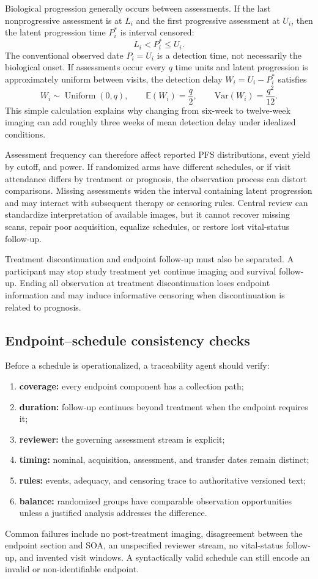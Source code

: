 \documentclass[12pt,oneside]{book}
\numberwithin{equation}{section}
\theoremstyle{definition}
\theoremstyle{plain}
\theoremstyle{remark}
\newcommand{\E}{\mathbb{E}}
\newcommand{\Var}{\mathrm{Var}}
\begin{document}
Biological progression generally occurs between assessments.  If the last
nonprogressive assessment is at $L_i$ and the first progressive assessment at
$U_i$, then the latent progression time $P_i^*$ is interval censored:
\[
  L_i<P_i^*\le U_i.
\]
The conventional observed date $P_i=U_i$ is a detection time, not necessarily
the biological onset.  If assessments occur every $q$ time units and latent
progression is approximately uniform between visits, the detection delay
$W_i=U_i-P_i^*$ satisfies
\[
  W_i\sim\operatorname{Uniform}(0,q),
  \qquad
  \E(W_i)=\frac q2,
  \qquad
  \Var(W_i)=\frac{q^2}{12}.
\]
This simple calculation explains why changing from six-week to twelve-week
imaging can add roughly three weeks of mean detection delay under idealized
conditions.

Assessment frequency can therefore affect reported PFS distributions, event
yield by cutoff, and power.  If randomized arms have different schedules, or
if visit attendance differs by treatment or prognosis, the observation process
can distort comparisons.  Missing assessments widen the interval containing
latent progression and may interact with subsequent therapy or censoring
rules.  Central review can standardize interpretation of available images, but
it cannot recover missing scans, repair poor acquisition, equalize schedules,
or restore lost vital-status follow-up.

Treatment discontinuation and endpoint follow-up must also be separated.  A
participant may stop study treatment yet continue imaging and survival
follow-up.  Ending all observation at treatment discontinuation loses endpoint
information and may induce informative censoring when discontinuation is
related to prognosis.

\subsection{Endpoint--schedule consistency checks}

Before a schedule is operationalized, a traceability agent should verify:
\begin{enumerate}
    \item \textbf{coverage:} every endpoint component has a collection path;
    \item \textbf{duration:} follow-up continues beyond treatment when the
    endpoint requires it;
    \item \textbf{reviewer:} the governing assessment stream is explicit;
    \item \textbf{timing:} nominal, acquisition, assessment, and transfer dates
    remain distinct;
    \item \textbf{rules:} events, adequacy, and censoring trace to authoritative
    versioned text;
    \item \textbf{balance:} randomized groups have comparable observation
    opportunities unless a justified analysis addresses the difference.
\end{enumerate}
Common failures include no post-treatment imaging, disagreement between the
endpoint section and SOA, an unspecified reviewer stream, no vital-status
follow-up, and invented visit windows.  A syntactically valid schedule can
still encode an invalid or non-identifiable endpoint.
\end{document}
